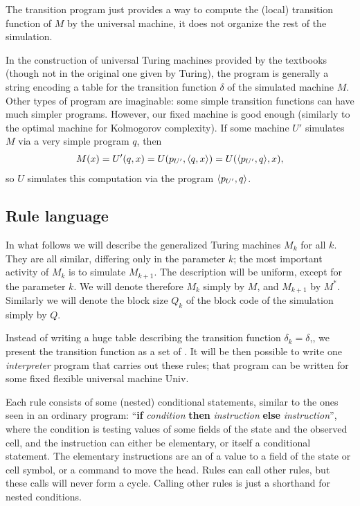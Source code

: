 \documentclass[12pt]{memoir}
\newcommand{\Un}{\mathrm{Univ}}
\begin{document}
The transition program just provides a way to compute
the (local) transition function of \( M \) by the universal machine,
it does not organize the rest of the simulation.

\begin{remark}
 In the construction of universal Turing machines provided by the textbooks
(though not in the original one given by Turing), the program is generally a string
encoding a table for the transition
function \( \delta \) of the simulated machine \( M \).
Other types of program are imaginable: some simple transition functions can
have much simpler programs.
However, our fixed machine is good enough (similarly to the optimal machine
for Kolmogorov complexity).
If some machine \( U' \) simulates \( M \) via a
very simple program \( q \), then
 \begin{align*}
     M(x)=U'(q,x) = U(p_{U'},{\mathopen\langle q,x\mathclose\rangle}) = U({\mathopen\langle p_{U'},q\mathclose\rangle},x),
 \end{align*}
so \( U \) simulates this computation via the program \( {\mathopen\langle p_{U'},q\mathclose\rangle} \).
\end{remark}

\subsection{Rule language}\label{sec:language}

In what follows we will describe the generalized Turing machines \( M_{k} \) for all \( k \).
They are all similar, differing only in the parameter \( k \); the most important activity
of \( M_{k} \) is to simulate \( M_{k+1} \).
The description will be uniform, except for the parameter \( k \).
We will denote therefore \( M_{k} \) simply by \( M \), and \( M_{k+1} \)  by \( M^{*} \).
Similarly we will denote the block size \( Q_{k} \) of the block code of the 
simulation simply by \( Q \).

Instead of writing a huge table describing the transition function \( \delta_{k}=\delta \),,
we present the transition function as a set of .
It will be then possible to write one \emph{interpreter} program that carries
out these rules; that program can be written for some fixed flexible 
universal machine \( \Un \).

Each rule consists of some (nested) conditional statements,
similar to the ones seen in an ordinary program:
 ``\textbf{if} \textit{condition} \textbf{then} \textit{instruction}
\textbf{else} \textit{instruction}'', 
where the condition
is testing values of some fields of the state and the observed cell, and
the instruction can either be elementary, or itself a conditional statement. 
The elementary instructions are an  of a value to a field
of the state or cell symbol, or a command to move the head.
Rules can call other rules, but these calls will never form a cycle.
Calling other rules is just a shorthand for nested conditions.
\end{document}
